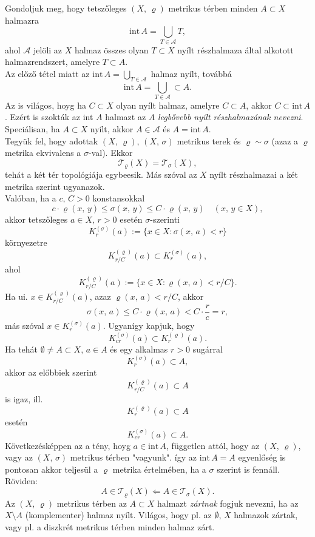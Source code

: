 \documentclass[12pt]{article}
\begin{document}
    Gondoljuk meg, hogy tetszőleges $(X, \, \varrho)$ metrikus térben minden $A \subset X$ halmazra
    \[
        \text{int} \, A = \bigcup_{T \in \mathcal{A}} T,
    \]
    ahol $\mathcal{A}$ jelöli az $X$ halmaz összes olyan $T \subset X$ nyílt részhalmaza által alkotott halmazrendszert, amelyre $T \subset A$.\\

    Az előző tétel miatt az $\displaystyle \text{int} \, A = \bigcup_{T \in \mathcal{A}}$ halmaz nyílt, továbbá
    \[
        \text{int} \, A = \bigcup_{T \in \mathcal{A}} \subset A.
    \]
    Az is világos, hoyg ha $C \subset X$ olyan nyílt halmaz, amelyre $C \subset A$, akkor $C \subset \text{int} \, A$. Ezért is szokták az int $A$ halmazt az $A$ \textit{legbővebb nyílt részhalmazának nevezni}. Speciálisan, ha $A \subset X$ nyílt, akkor $A \in \mathcal{A}$ és $A = \text{int} \, A$. \\

    Tegyük fel, hogy adottak $(X,\,\varrho), \, (X, \, \sigma)$ metrikus terek és $\varrho \sim \sigma$ (azaz a $\varrho$ metrika ekvivalens a $\sigma$-val). Ekkor
    \[
        \mathcal{T}_\varrho(X) = \mathcal{T}_\sigma(X),
    \]
    tehát a két tér topológiája egybeesik. Más szóval az $X$ nyílt részhalmazai a két metrika szerint ugyanazok. \\

    Valóban, ha a $c, \, C > 0$ konstansokkal
    \[
        c \cdot \varrho(x, \, y) \leq \sigma(x,\,y) \leq C \cdot \varrho(x, \, y) \quad (x, \, y \in X),
    \]
    akkor tetszőleges $a \in X, \, r > 0$ esetén $\sigma$-szerinti
    \[
        K_r^{(\sigma)}(a) := \{ x \in X : \sigma(x, \, a) < r \}
    \]
    környezetre
    \[
        K_{r/C}^{(\varrho)}(a) \subset K_r^{(\sigma)}(a),
    \]
    ahol
    \[
        K_{r/C}^{(\varrho)}(a) := \{ x \in X : \varrho(x, \, a) < r / C \}.
    \]
    Ha ui. $x \in K_{r/C}^{(\varrho)}(a)$, azaz $\varrho(x, \, a) < r / C$, akkor
    \[
        \sigma(x, \, a) \leq C \cdot \varrho(x, \, a) < C \cdot \frac{r}{c} = r,
    \]
    más szóval $x \in K_r^{(\sigma)}(a)$. Ugyanígy kapjuk, hogy
    \[
        K_{cr}^{(\sigma)}(a) \subset K_r^{(\varrho)}(a).
    \]
    Ha tehát $\emptyset \neq A \subset X, \, a \in A$ és egy alkalmas $r >0$ sugárral
    \[
        K_r^{(\sigma)}(a) \subset A,
    \]
    akkor az előbbiek szerint
    \[
        K_{r / C}^{(\varrho)}(a) \subset A
    \]
    is igaz, ill.
    \[
        K_r^{(\varrho)}(a) \subset A
    \]
    esetén
    \[
        K_{cr}^{(\sigma)}(a) \subset A.
    \]
    Következésképpen az a tény, hoyg $a \in \text{int} \, A$, független attól, hogy az $(X, \, \varrho)$, vagy az $(X, \, \sigma)$ metrikus térben "vagyunk". így az $\text{int} \, A = A$ egyenlőség is pontosan akkor teljesül a $\varrho$ metrika értelmében, ha a $\sigma$ szerint is fennáll. Röviden:
    \[
        A \in \mathcal{T}_\varrho(X) \Longleftarrow A \in \mathcal{T}_\sigma(X).
    \]
    Az $(X, \, \varrho)$ metrikus térben az $A \subset X$ halmazt \textit{zártnak} fogjuk nevezni, ha az $X \setminus A$ (komplementer) halmaz nyílt. Világos, hogy pl. az $\emptyset, \, X$ halmazok zártak, vagy pl. a diszkrét metrikus térben minden halmaz zárt.\\
\end{document}
